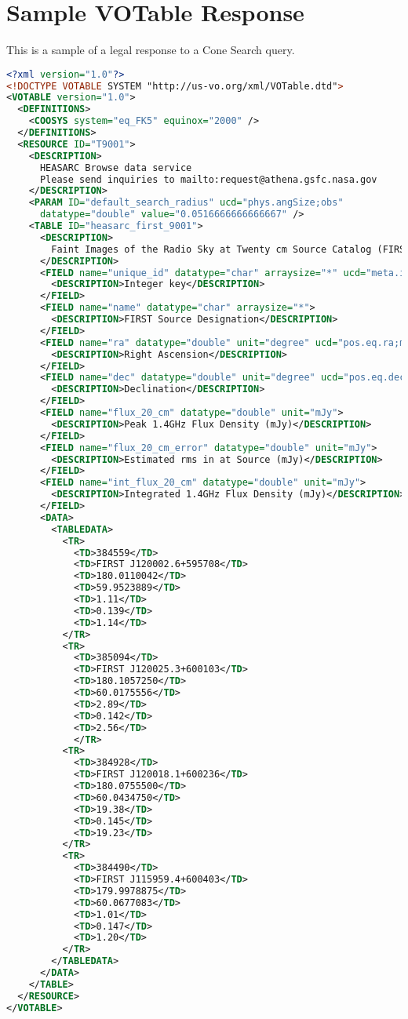 \documentclass[11pt,a4paper]{ivoa}
\begin{document}
\appendix

\section{Sample VOTable Response}
\label{appendix:a}

This is a sample of a legal response to a Cone Search query.

\begin{lstlisting}[language=XML,basicstyle=\footnotesize] 
<?xml version="1.0"?>
<!DOCTYPE VOTABLE SYSTEM "http://us-vo.org/xml/VOTable.dtd">
<VOTABLE version="1.0">
  <DEFINITIONS>
    <COOSYS system="eq_FK5" equinox="2000" />
  </DEFINITIONS>
  <RESOURCE ID="T9001">
    <DESCRIPTION>
      HEASARC Browse data service
      Please send inquiries to mailto:request@athena.gsfc.nasa.gov
    </DESCRIPTION>
    <PARAM ID="default_search_radius" ucd="phys.angSize;obs" 
      datatype="double" value="0.0516666666666667" />
    <TABLE ID="heasarc_first_9001">
      <DESCRIPTION>
        Faint Images of the Radio Sky at Twenty cm Source Catalog (FIRST)
      </DESCRIPTION>
      <FIELD name="unique_id" datatype="char" arraysize="*" ucd="meta.id;meta.main">
        <DESCRIPTION>Integer key</DESCRIPTION>
      </FIELD>
      <FIELD name="name" datatype="char" arraysize="*">
        <DESCRIPTION>FIRST Source Designation</DESCRIPTION>
      </FIELD>
      <FIELD name="ra" datatype="double" unit="degree" ucd="pos.eq.ra;meta.main">
        <DESCRIPTION>Right Ascension</DESCRIPTION>
      </FIELD>
      <FIELD name="dec" datatype="double" unit="degree" ucd="pos.eq.dec;meta.main">
        <DESCRIPTION>Declination</DESCRIPTION>
      </FIELD>
      <FIELD name="flux_20_cm" datatype="double" unit="mJy">
        <DESCRIPTION>Peak 1.4GHz Flux Density (mJy)</DESCRIPTION>
      </FIELD>
      <FIELD name="flux_20_cm_error" datatype="double" unit="mJy">
        <DESCRIPTION>Estimated rms in at Source (mJy)</DESCRIPTION>
      </FIELD>
      <FIELD name="int_flux_20_cm" datatype="double" unit="mJy">
        <DESCRIPTION>Integrated 1.4GHz Flux Density (mJy)</DESCRIPTION>
      </FIELD>
      <DATA>
        <TABLEDATA>
          <TR>
            <TD>384559</TD>
            <TD>FIRST J120002.6+595708</TD>
            <TD>180.0110042</TD>
            <TD>59.9523889</TD>
            <TD>1.11</TD>
            <TD>0.139</TD>
            <TD>1.14</TD>
          </TR>
          <TR>
            <TD>385094</TD>
            <TD>FIRST J120025.3+600103</TD>
            <TD>180.1057250</TD>
            <TD>60.0175556</TD>
            <TD>2.89</TD>
            <TD>0.142</TD>
            <TD>2.56</TD>
            </TR>
          <TR>
            <TD>384928</TD>
            <TD>FIRST J120018.1+600236</TD>
            <TD>180.0755500</TD>
            <TD>60.0434750</TD>
            <TD>19.38</TD>
            <TD>0.145</TD>
            <TD>19.23</TD>
          </TR>
          <TR>
            <TD>384490</TD>
            <TD>FIRST J115959.4+600403</TD>
            <TD>179.9978875</TD>
            <TD>60.0677083</TD>
            <TD>1.01</TD>
            <TD>0.147</TD>
            <TD>1.20</TD>
          </TR>
        </TABLEDATA>
      </DATA>
    </TABLE>
  </RESOURCE>
</VOTABLE>
\end{lstlisting}
\end{document}
